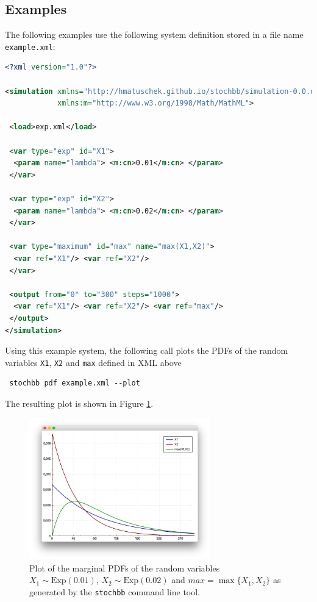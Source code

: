 \documentclass[a4paper, 10pt]{paper}
\newcommand{\code}[1]{\texttt{#1}}
\begin{document}
\subsection{Examples}
The following examples use the following system definition stored in a file name \code{example.xml}:
\begin{lstlisting}[language=XML]
<?xml version="1.0"?>

<simulation xmlns="http://hmatuschek.github.io/stochbb/simulation-0.0.dtd"
            xmlns:m="http://www.w3.org/1998/Math/MathML">

 <load>exp.xml</load>

 <var type="exp" id="X1">
  <param name="lambda"> <m:cn>0.01</m:cn> </param>
 </var>

 <var type="exp" id="X2">
  <param name="lambda"> <m:cn>0.02</m:cn> </param>
 </var>

 <var type="maximum" id="max" name="max(X1,X2)">
  <var ref="X1"/> <var ref="X2"/>
 </var>

 <output from="0" to="300" steps="1000">
  <var ref="X1"/> <var ref="X2"/> <var ref="max"/>
 </output>
</simulation>
\end{lstlisting}

Using this example system, the following call plots the PDFs of the random variables \code{X1}, \code{X2} and \code{max} defined in XML above
\begin{lstlisting}
 stochbb pdf example.xml --plot
\end{lstlisting}
The resulting plot is shown in Figure \ref{fig:exampleplot1}.	

\begin{figure}
 \centering
  \includegraphics[width=0.7\textwidth]{exampleplot1.png}
  \caption{Plot of the marginal PDFs of the random variables $X_1\sim \text{Exp}(0.01)$, $X_2\sim \text{Exp}(0.02)$ and 
	$max = \max\{X_1,X_2\}$ as generated by the \code{stochbb} command line tool.} \label{fig:exampleplot1}
\end{figure}
\end{document}
